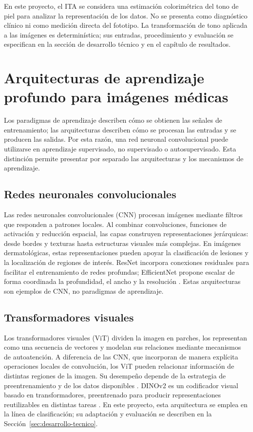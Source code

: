 En este proyecto, el ITA se considera una estimación colorimétrica del tono de piel para analizar la representación de los datos. No se presenta como diagnóstico clínico ni como medición directa del fototipo. La transformación de tono aplicada a las imágenes es determinística; sus entradas, procedimiento y evaluación se especifican en la sección de desarrollo técnico y en el capítulo de resultados.

\section{Arquitecturas de aprendizaje profundo para imágenes médicas}

Los paradigmas de aprendizaje describen cómo se obtienen las señales de entrenamiento; las arquitecturas describen cómo se procesan las entradas y se producen las salidas. Por esta razón, una red neuronal convolucional puede utilizarse en aprendizaje supervisado, no supervisado o autosupervisado. Esta distinción permite presentar por separado las arquitecturas y los mecanismos de aprendizaje.

\subsection{Redes neuronales convolucionales}

Las redes neuronales convolucionales (CNN) procesan imágenes mediante filtros que responden a patrones locales. Al combinar convoluciones, funciones de activación y reducción espacial, las capas construyen representaciones jerárquicas: desde bordes y texturas hasta estructuras visuales más complejas. En imágenes dermatológicas, estas representaciones pueden apoyar la clasificación de lesiones y la localización de regiones de interés. ResNet incorpora conexiones residuales para facilitar el entrenamiento de redes profundas; EfficientNet propone escalar de forma coordinada la profundidad, el ancho y la resolución \parencite{he2016resnet,tan2019efficientnet}. Estas arquitecturas son ejemplos de CNN, no paradigmas de aprendizaje.

\subsection{Transformadores visuales}

Los transformadores visuales (ViT) dividen la imagen en parches, los representan como una secuencia de vectores y modelan sus relaciones mediante mecanismos de autoatención. A diferencia de las CNN, que incorporan de manera explícita operaciones locales de convolución, los ViT pueden relacionar información de distintas regiones de la imagen. Su desempeño depende de la estrategia de preentrenamiento y de los datos disponibles \parencite{dosovitskiy2021image}. DINOv2 es un codificador visual basado en transformadores, preentrenado para producir representaciones reutilizables en distintas tareas \parencite{oquab2024dinov2}. En este proyecto, esta arquitectura se emplea en la línea de clasificación; su adaptación y evaluación se describen en la Sección~\ref{sec:desarrollo-tecnico}.

